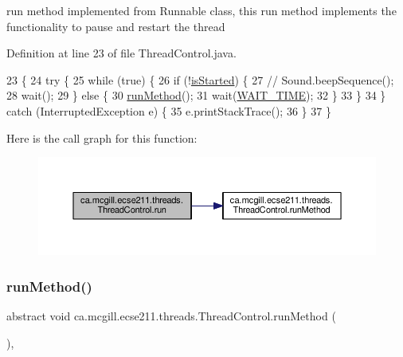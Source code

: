 run method implemented from Runnable class, this run method implements the functionality to pause and restart the thread 

Definition at line 23 of file Thread\+Control.\+java.


\begin{DoxyCode}
23                                  \{
24     \textcolor{keywordflow}{try} \{
25       \textcolor{keywordflow}{while} (\textcolor{keyword}{true}) \{
26         \textcolor{keywordflow}{if} (!\hyperlink{classca_1_1mcgill_1_1ecse211_1_1threads_1_1_thread_control_a92f4933511db42476e39956246bcf2fe}{isStarted}) \{
27           \textcolor{comment}{// Sound.beepSequence();}
28           wait();
29         \} \textcolor{keywordflow}{else} \{
30           \hyperlink{classca_1_1mcgill_1_1ecse211_1_1threads_1_1_thread_control_a2959c54bdb6c62c9d5569cdf3ccf2418}{runMethod}();
31           wait(\hyperlink{classca_1_1mcgill_1_1ecse211_1_1threads_1_1_thread_control_a395cfe1d73b3ef14da0830ed0a499f82}{WAIT\_TIME});
32         \}
33       \}
34     \} \textcolor{keywordflow}{catch} (InterruptedException e) \{
35       e.printStackTrace();
36     \}
37   \}
\end{DoxyCode}
Here is the call graph for this function\+:\nopagebreak
\begin{figure}[H]
\begin{center}
\leavevmode
\includegraphics[width=350pt]{classca_1_1mcgill_1_1ecse211_1_1threads_1_1_thread_control_a03e743000ea2c37080427565e8ec5f35_cgraph}
\end{center}
\end{figure}
\mbox{\label{classca_1_1mcgill_1_1ecse211_1_1threads_1_1_thread_control_a2959c54bdb6c62c9d5569cdf3ccf2418}} 
\subsubsection{\texorpdfstring{run\+Method()}{runMethod()}}
{\footnotesize\ttfamily abstract void ca.\+mcgill.\+ecse211.\+threads.\+Thread\+Control.\+run\+Method (\begin{DoxyParamCaption}{ }\end{DoxyParamCaption})\hspace{0.3cm}{\ttfamily [abstract]}, {\ttfamily [protected]}}

